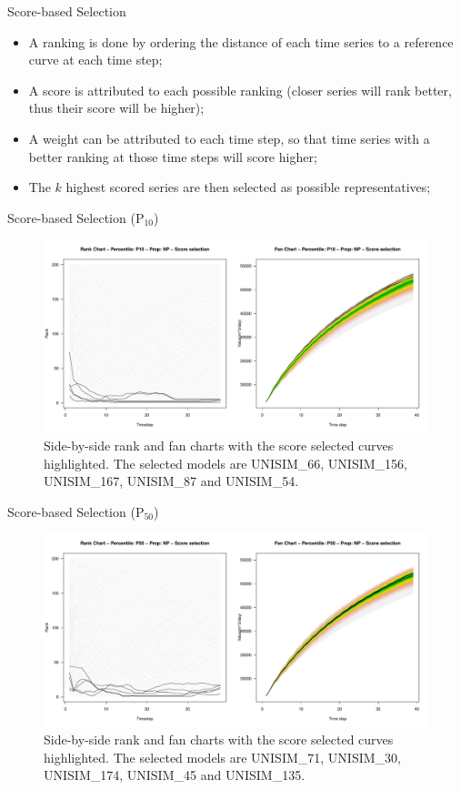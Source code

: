 \documentclass{beamer}
\begin{document}
\begin{frame}{Score-based Selection}
  \begin{itemize}
    \item A ranking is done by ordering the distance of each time series to a reference curve at each time step;
    \item A score is attributed to each possible ranking (closer series will rank better, thus their score will be higher);
    \item A weight can be attributed to each time step, so that time series with a better ranking at those time steps will score higher;
    \item The $k$ highest scored series are then selected as possible representatives;
  \end{itemize}
\end{frame}

\begin{frame}{Score-based Selection (P$_{10}$)}
  \begin{figure}[H]
    \centering
    \includegraphics[width=\columnwidth]{rank-fan-score-p10.pdf}
    \caption{Side-by-side rank and fan charts with the score selected curves highlighted. The selected models are UNISIM\_66, UNISIM\_156, UNISIM\_167, UNISIM\_87 and UNISIM\_54.}
    \label{fig:rank-fan-score-p10}
  \end{figure}
\end{frame}

\begin{frame}{Score-based Selection (P$_{50}$)}
  \begin{figure}[H]
    \centering
    \includegraphics[width=\columnwidth]{rank-fan-score-p50.pdf}
    \caption{Side-by-side rank and fan charts with the score selected curves highlighted. The selected models are UNISIM\_71, UNISIM\_30, UNISIM\_174, UNISIM\_45 and UNISIM\_135.}
    \label{fig:rank-fan-score-p50}
  \end{figure}
\end{frame}
\end{document}

